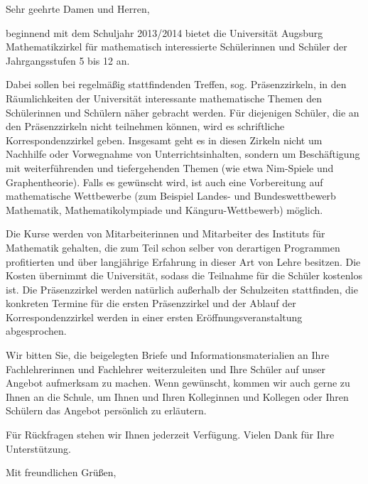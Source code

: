 \documentclass{zirkelbrief}
\begin{document}
\renewcommand{\anschrift}{%
      Holbein-Gymnasium Augsburg \\
      Fachbereich Mathematik \\
      Hallstraße 10 \\
      86150 Augsburg}
\renewcommand{\datum}{2.9.2013}
\renewcommand{\betreff}{Matheschülerzirkel der Universität Augsburg}

\makeletterhead

Sehr geehrte Damen und Herren,

beginnend mit dem Schuljahr 2013/2014 bietet die Universität Augsburg
Mathematikzirkel für mathematisch interessierte Schülerinnen und Schüler der
Jahrgangsstufen 5 bis 12 an.

Dabei sollen bei regelmäßig stattfindenden Treffen, sog. Präsenzzirkeln, in den
Räum\-lich\-kei\-ten der Universität interessante mathematische Themen den
Schülerinnen und Schülern näher gebracht werden. Für diejenigen Schüler, die an
den Präsenzzirkeln nicht teilnehmen können, wird es schriftliche
Korrespondenzzirkel geben. Insgesamt geht es in diesen Zirkeln nicht um
Nachhilfe oder Vorwegnahme von Unterrichtsinhalten, sondern um Beschäftigung
mit weiterführenden und tiefergehenden Themen (wie etwa Nim-Spiele und
Graphentheorie). Falls es gewünscht wird, ist auch eine Vorbereitung auf
mathematische Wettbewerbe (zum Beispiel Landes- und Bundeswettbewerb
Mathematik, Mathematikolympiade und Känguru-Wettbewerb) möglich. 

Die Kurse werden von Mitarbeiterinnen und Mitarbeiter des Instituts für
Mathematik gehalten, die zum Teil schon selber von derartigen Programmen
profitierten und über langjährige Erfahrung in dieser Art von Lehre besitzen.
Die Kosten übernimmt die Universität, sodass die Teilnahme für die Schüler
kostenlos ist. Die Präsenzzirkel werden natürlich außerhalb der Schulzeiten
stattfinden, die konkreten Termine für die ersten Präsenzzirkel und der Ablauf
der Korrespondenzzirkel werden in einer ersten Eröffnungsveranstaltung
abgesprochen.

Wir bitten Sie, die beigelegten Briefe und Informationsmaterialien an Ihre
Fachlehrerinnen und Fachlehrer weiterzuleiten und Ihre Schüler auf unser
Angebot aufmerksam zu machen. Wenn gewünscht, kommen wir auch gerne zu Ihnen an
die Schule, um Ihnen und Ihren Kolleginnen und Kollegen oder Ihren Schülern das
Angebot persönlich zu erläutern. 

Für Rückfragen stehen wir Ihnen jederzeit Verfügung. Vielen Dank für Ihre
Unterstützung. 

Mit freundlichen Grüßen,
\end{document}
